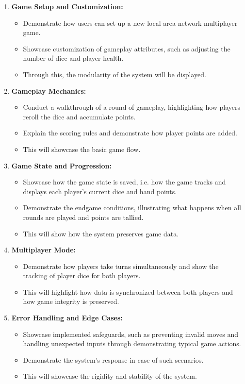 \documentclass{article}
\begin{document}
\begin{enumerate}
    \item \textbf{Game Setup and Customization:}
    \begin{itemize}
        \item Demonstrate how users can set up a new local area network multiplayer game.
        \item Showcase customization of gameplay attributes, such as adjusting the number of dice and player health.
        \item Through this, the modularity of the system will be displayed.
    \end{itemize}
    
    \item \textbf{Gameplay Mechanics:}
    \begin{itemize}
        \item Conduct a walkthrough of a round of gameplay, highlighting how players reroll the dice and accumulate points.
        \item Explain the scoring rules and demonstrate how player points are added.
        \item This will showcase the basic game flow.
    \end{itemize}
    
    \item \textbf{Game State and Progression:}
    \begin{itemize}
        \item Showcase how the game state is saved, i.e. how the game tracks and displays each player's current dice and hand points.
        \item Demonstrate the endgame conditions, illustrating what happens when all rounds are played and points are tallied.
        \item This will show how the system preserves game data.
    \end{itemize}
    
    \item \textbf{Multiplayer Mode:}
    \begin{itemize}
        \item Demonstrate how players take turns simultaneously and show the tracking of player dice for both players.
        \item This will highlight how data is synchronized between both players and how game integrity is preserved.
    \end{itemize}
    
    \item \textbf{Error Handling and Edge Cases:}
    \begin{itemize}
        \item Showcase implemented safeguards, such as preventing invalid moves and handling unexpected inputs through demonstrating typical game actions.
        \item Demonstrate the system's response in case of such scenarios.
        \item This will showcase the rigidity and stability of the system.
    \end{itemize}
\end{enumerate}
\end{document}
